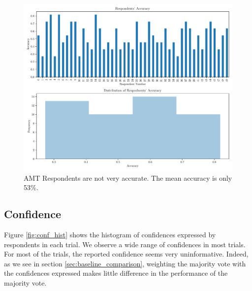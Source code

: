 \documentclass{report}
\theoremstyle{definition}
\begin{document}
\begin{figure}
    \vspace*{-1cm}
    \centering
    \includegraphics[width=\textwidth]{exp1_accuracy.pdf}
    \caption{AMT Respondents are not very accurate. The mean accuracy is only 53\%.}
    \label{fig:exp1_acc}
\end{figure}

\subsection{Confidence}
\label{sec:conf}
Figure \ref{fig:conf_hist} shows the histogram of confidences expressed by respondents in each trial. We observe a wide range of confidences in most trials. For most of the trials, the reported confidence seems very uninformative. Indeed, as we see in section \ref{sec:baseline_comparison}, weighting the majority vote with the confidences expressed makes little difference in the performance of the majority vote.
\end{document}
